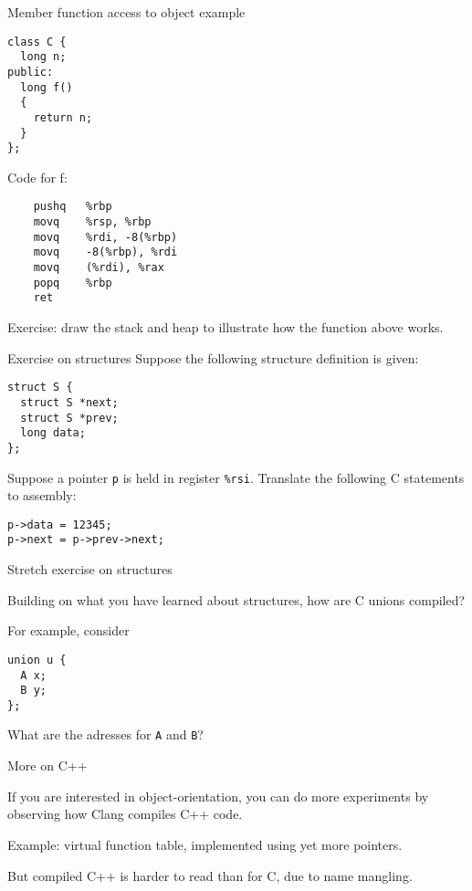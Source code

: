 \documentclass[landscape]{beamer}
\begin{document}
\begin{frame}[fragile]{Member function access to object example}
\begin{minipage}{.5\textwidth}
\begin{verbatim}
class C {
  long n;
public:
  long f() 
  { 
    return n; 
  }
};
\end{verbatim}
\end{minipage}
%
\begin{minipage}{.4\textwidth}
Code for f:
\begin{verbatim}
	pushq	%rbp
	movq	%rsp, %rbp
	movq	%rdi, -8(%rbp)
	movq	-8(%rbp), %rdi
	movq	(%rdi), %rax
	popq	%rbp
	ret
\end{verbatim}
\end{minipage}

\vspace{3em}

Exercise: draw the stack and heap to illustrate how the function above works.
\end{frame}


\begin{frame}[fragile]{Exercise on structures}
Suppose the following structure definition is given:
\begin{verbatim}
struct S {
  struct S *next;
  struct S *prev;
  long data;
};
\end{verbatim}
%
Suppose a pointer \texttt p is held in register \texttt{\%rsi}. Translate the following C statements to assembly:
\begin{verbatim}
p->data = 12345;
p->next = p->prev->next;
\end{verbatim}
\end{frame}

\begin{frame}[fragile]{Stretch exercise on structures}

Building on what you have learned about structures, how are C unions compiled?

For example, consider 
\begin{verbatim}
union u {
  A x;
  B y;
};
\end{verbatim}

What are the adresses for \texttt{A} and \texttt{B}?
\end{frame}

\begin{frame}{More on C++}

If you are interested in object-orientation, you can do more experiments by observing how Clang compiles C++ code.

Example: virtual function table, implemented using yet more pointers.

But compiled C++ is harder to read than for C, due to name mangling. 
\end{frame}
\end{document}
